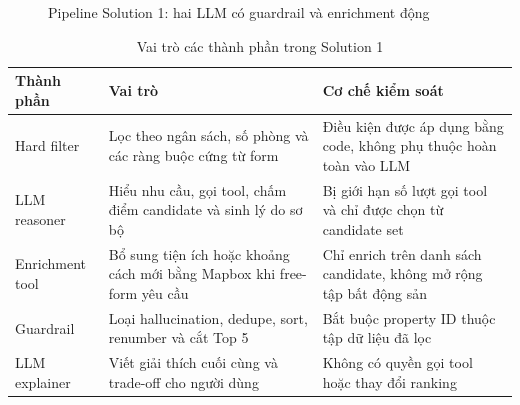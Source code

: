\documentclass[a4paper,12pt]{article}
\begin{document}
\begin{figure}[H]
\centering
{}
\caption{Pipeline Solution 1: hai LLM có guardrail và enrichment động}
\label{fig:solution1_pipeline}
\end{figure}

\begin{table}[H]
\centering
\caption{Vai trò các thành phần trong Solution 1}
\label{tab:solution1_components}
\small
\begin{tabularx}{\textwidth}{|P{3.7cm}|Y|Y|}
\hline
\textbf{Thành phần} & \textbf{Vai trò} & \textbf{Cơ chế kiểm soát} \\ \hline
Hard filter & Lọc theo ngân sách, số phòng và các ràng buộc cứng từ form & Điều kiện được áp dụng bằng code, không phụ thuộc hoàn toàn vào LLM \\ \hline
LLM reasoner & Hiểu nhu cầu, gọi tool, chấm điểm candidate và sinh lý do sơ bộ & Bị giới hạn số lượt gọi tool và chỉ được chọn từ candidate set \\ \hline
Enrichment tool & Bổ sung tiện ích hoặc khoảng cách mới bằng Mapbox khi free-form yêu cầu & Chỉ enrich trên danh sách candidate, không mở rộng tập bất động sản \\ \hline
Guardrail & Loại hallucination, dedupe, sort, renumber và cắt Top 5 & Bắt buộc property ID thuộc tập dữ liệu đã lọc \\ \hline
LLM explainer & Viết giải thích cuối cùng và trade-off cho người dùng & Không có quyền gọi tool hoặc thay đổi ranking \\ \hline
\end{tabularx}
\end{table}
\end{document}
